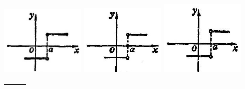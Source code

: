 \documentclass[lang=cn,newtx,12pt,scheme=chinese]{elegantbook}
\begin{document}
\begin{problemset}[练习]
\begin{center}
	\includegraphics[max width=0.3\textwidth]{images/01912c18-5c3f-733d-b775-749ba9897a9d_36_706273.jpg}
	\includegraphics[max width=0.3\textwidth]{images/01912c18-5c3f-733d-b775-749ba9897a9d_36_222184.jpg}
	\includegraphics[max width=0.3\textwidth]{images/01912c18-5c3f-733d-b775-749ba9897a9d_36_774109.jpg}
\end{center}

\noindent %
\begin{tabular}{ccc}
	\makebox[0.3\textwidth][c]{(3)} &
	\makebox[0.3\textwidth][c]{(4)} &
	\makebox[0.3\textwidth][c]{(5)}
\end{tabular}


\end{problemset}
\end{document}
